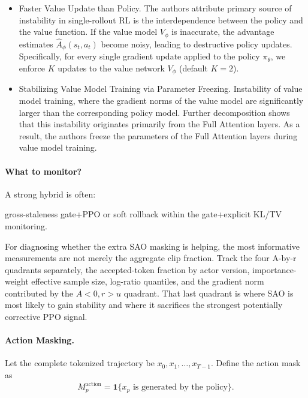 \begin{itemize}
    \item Faster Value Update than Policy. The authors attribute primary source of instability in single-rollout RL is the interdependence between the policy and the value function. If the value model $V_{\phi}$ is inaccurate, the advantage estimates $\hat{A}_{\phi}(s_t,a_t)$ become noisy, leading to destructive policy updates. Specifically, for every single gradient update applied to the policy $\pi_{\theta}$, we enforce $K$ updates to the value network $V_{\phi}$ (default $K=2$).
    \item Stabilizing Value Model Training via Parameter Freezing. Instability of value model training, where the gradient norms of the value model are significantly larger than the corresponding policy model. Further decomposition shows that this instability originates primarily from the Full Attention layers. As a result, the authors freeze the parameters of the Full Attention layers during value model training.
\end{itemize}

\paragraph{What to monitor?}
A strong hybrid is often:

\begin{center}
     gross-staleness gate+PPO or soft rollback within the gate+explicit KL/TV monitoring.
\end{center}

For diagnosing whether the extra SAO masking is helping, the most informative measurements are not merely the aggregate clip fraction. Track the four A-by-r quadrants separately, the accepted-token fraction by actor version, importance-weight effective sample size, log-ratio quantiles, and the gradient norm contributed by the $A<0,r>u$ quadrant. That last quadrant is where SAO is most likely to gain stability and where it sacrifices the strongest potentially corrective PPO signal.

\paragraph{Action Masking.}

Let the complete tokenized trajectory be $x_0,x_1,\ldots,x_{T-1}$. Define the action mask as
\[M_p^{\text{action}}=\mathbf{1}\{x_p \text{ is generated by the policy}\}.\]

